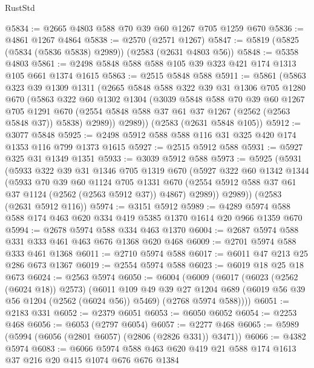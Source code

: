 \begin{lexlean}{RustStd}
\begin{coremodule}
@5834 := @2665 @4803 @588 @70 @39 @60 @1267 @705 @1259 @670
@5836 := @4861 @1267 @4864
@5838 := @2570 (@2571 @1267)
@5847 := @5819 (@5825 (@5834 (@5836 @5838) @2989)) (@2583 (@2631 @4803 @56))
@5848 := @5358 @4803
@5861 := @2498 @5848 @588 @588 @105 @39 @323 @421 @174 @1313 @105 @661 @1374 @1615
@5863 := @2515 @5848 @588
@5911 := @5861
    (@5863
      @323
      @39
      @1309
      @1311
      (@2665
        @5848
        @588
        @322
        @39
        @31
        @1306
        @705
        @1280
        @670
        (@5863
          @322
          @60
          @1302
          @1304
          (@3039
            @5848
            @588
            @70
            @39
            @60
            @1267
            @705
            @1291
            @670
            (@2554 @5848 @588 @37 @61 @37 @1267 (@2562 (@2563 @5848 @37)) @5838)
            @2989))
        @2989))
    (@2583 (@2631 @5848 @105))
@5912 := @3077 @5848
@5925 := @2498 @5912 @588 @588 @116 @31 @325 @420 @174 @1353 @116 @799 @1373 @1615
@5927 := @2515 @5912 @588
@5931 := @5927 @325 @31 @1349 @1351
@5933 := @3039 @5912 @588
@5973 := @5925
    (@5931
      (@5933
        @322
        @39
        @31
        @1346
        @705
        @1319
        @670
        (@5927
          @322
          @60
          @1342
          @1344
          (@5933
            @70
            @39
            @60
            @1124
            @705
            @1331
            @670
            (@2554 @5912 @588 @37 @61 @37 @1124 (@2562 (@2563 @5912 @37)) @4867)
            @2989))
        @2989))
    (@2583 (@2631 @5912 @116))
@5974 := @3151 @5912
@5989 := @4289 @5974 @588 @588 @174 @463 @620 @334 @419 @5385 @1370 @1614 @20 @966 @1359 @670
@5994 := @2678 @5974 @588 @334 @463 @1370
@6004 := @2687 @5974 @588 @331 @333 @461 @463 @676 @1368 @620 @468
@6009 := @2701 @5974 @588 @333 @461 @1368
@6011 := @2710 @5974 @588
@6017 := @6011 @47 @213 @25 @286 @673 @1367
@6019 := @2554 @5974 @588
@6023 := @6019 @18 @25 @18 @673
@6024 := @2563 @5974
@6050 := @6004
    (@6009
      (@6017
        (@6023 (@2562 (@6024 @18)) @2573)
        (@6011
          @109
          @49
          @39
          @27
          @1204
          @689
          (@6019 @56 @39 @56 @1204 (@2562 (@6024 @56)) @5469)
          (@2768 @5974 @588))))
@6051 := @2183 @331
@6052 := @2379 @6051
@6053 := @6050 @6052
@6054 := @2253 @468
@6056 := @6053 (@2797 @6054)
@6057 := @2277 @468
@6065 := @5989 (@5994 (@6056 (@2801 @6057) (@2806 (@2826 @331)) @3471))
@6066 := @4382 @5974
@6083 := @6066 @5974 @588 @463 @620 @419 @21 @588 @174 @1613 @37 @216 @20 @415 @1074 @676 @676 @1384

\end{coremodule}
\end{lexlean}

